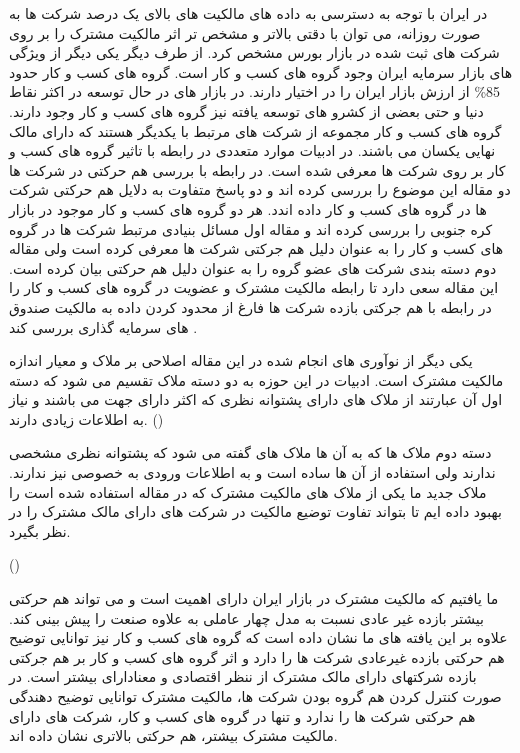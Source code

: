 \documentclass[12pt, a4paper]{article}
\begin{document}
در ایران با توجه به دسترسی به داده های مالکیت های بالای یک درصد شرکت ها به صورت روزانه، می توان با دقتی بالاتر و مشخص تر اثر مالکیت مشترک را بر روی شرکت های ثبت شده در بازار بورس مشخص کرد.  از طرف دیگر یکی دیگر از ویژگی های بازار سرمایه ایران وجود گروه های کسب و کار است. گروه های کسب و کار حدود 85\% از ارزش بازار ایران را در اختیار دارند.  در بازار های در حال توسعه در اکثر نقاط دنیا و حتی بعضی از کشرو های توسعه یافته نیز گروه های کسب و کار وجود دارند. گروه های کسب و کار مجموعه از شرکت های مرتبط با یکدیگر هستند که دارای مالک نهایی یکسان می باشند. در ادبیات موارد متعددی در رابطه با تاثیر گروه های کسب و کار بر روی شرکت ها معرفی  شده است. در رابطه با بررسی هم حرکتی در شرکت ها دو مقاله 
این موضوع را بررسی کرده اند و دو پاسخ متفاوت به دلایل هم حرکتی شرکت ها در گروه های کسب و کار داده اندد. هر دو گروه های کسب و کار موجود در بازار کره جنوبی را بررسی کرده اند و مقاله اول مسائل بنیادی مرتبط شرکت ها در گروه های کسب و کار را به عنوان دلیل هم جرکتی شرکت ها معرفی کرده است ولی مقاله دوم دسته بندی شرکت های عضو گروه را به عنوان دلیل هم حرکتی بیان کرده است. 
این مقاله سعی دارد تا رابطه مالکیت مشترک و عضویت در گروه های کسب و کار را در رابطه با هم جرکتی بازده شرکت ها فارغ از محدود کردن داده به مالکیت صندوق های سرمایه گذاری بررسی کند .

یکی دیگر از نوآوری های انجام شده در این مقاله اصلاحی بر ملاک و معیار اندازه مالکیت مشترک است. ادبیات در این حوزه به دو دسته ملاک تقسیم می شود که دسته اول آن عبارتند از  ملاک های دارای پشتوانه نظری که اکثر دارای جهت می باشند و نیاز به اطلاعات زیادی دارند.
()

 دسته دوم ملاک ها که به آن ها ملاک های 
گفته می شود که پشتوانه نظری مشخصی ندارند ولی استفاده از آن ها ساده است و به اطلاعات ورودی به خصوصی نیز ندارند. ملاک جدید ما یکی از ملاک های مالکیت مشترک که در مقاله 
استفاده شده است را بهبود داده ایم تا بتواند تفاوت توضیع مالکیت در شرکت های دارای مالک مشترک را در نظر بگیرد.

()

\FloatBarrier

ما یافتیم که مالکیت مشترک در بازار ایران دارای اهمیت است و می تواند هم حرکتی بیشتر بازده غیر عادی نسبت به مدل چهار عاملی به علاوه صنعت را پیش بینی کند. علاوه بر این یافته های ما نشان داده است که گروه های کسب و کار نیز توانایی توضیح هم حرکتی بازده غیرعادی شرکت ها را دارد و اثر گروه های کسب و کار بر هم جرکتی بازده شرکتهای دارای مالک مشترک  از ننظر اقتصادی و معنادارای بیشتر است. در صورت کنترل کردن هم گروه بودن شرکت ها، مالکیت مشترک توانایی توضیح دهندگی هم حرکتی شرکت ها را ندارد و تنها در گروه های کسب و کار، شرکت های دارای مالکیت مشترک بیشتر، هم حرکتی بالاتری نشان داده اند. 
\end{document}
